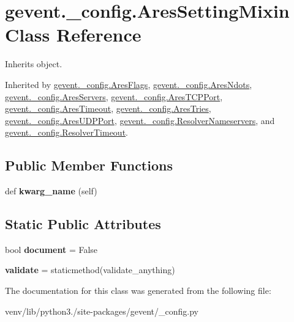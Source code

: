 \hypertarget{classgevent_1_1__config_1_1_ares_setting_mixin}{}\section{gevent.\+\_\+config.\+Ares\+Setting\+Mixin Class Reference}
\label{classgevent_1_1__config_1_1_ares_setting_mixin}


Inherits object.



Inherited by \hyperlink{classgevent_1_1__config_1_1_ares_flags}{gevent.\+\_\+config.\+Ares\+Flags}, \hyperlink{classgevent_1_1__config_1_1_ares_ndots}{gevent.\+\_\+config.\+Ares\+Ndots}, \hyperlink{classgevent_1_1__config_1_1_ares_servers}{gevent.\+\_\+config.\+Ares\+Servers}, \hyperlink{classgevent_1_1__config_1_1_ares_t_c_p_port}{gevent.\+\_\+config.\+Ares\+T\+C\+P\+Port}, \hyperlink{classgevent_1_1__config_1_1_ares_timeout}{gevent.\+\_\+config.\+Ares\+Timeout}, \hyperlink{classgevent_1_1__config_1_1_ares_tries}{gevent.\+\_\+config.\+Ares\+Tries}, \hyperlink{classgevent_1_1__config_1_1_ares_u_d_p_port}{gevent.\+\_\+config.\+Ares\+U\+D\+P\+Port}, \hyperlink{classgevent_1_1__config_1_1_resolver_nameservers}{gevent.\+\_\+config.\+Resolver\+Nameservers}, and \hyperlink{classgevent_1_1__config_1_1_resolver_timeout}{gevent.\+\_\+config.\+Resolver\+Timeout}.

\subsection*{Public Member Functions}
\begin{DoxyCompactItemize}
\item 
\mbox{\label{classgevent_1_1__config_1_1_ares_setting_mixin_ad3edccb92ed533726ac24e6e3cb8096a}} 
def {\bfseries kwarg\+\_\+name} (self)
\end{DoxyCompactItemize}
\subsection*{Static Public Attributes}
\begin{DoxyCompactItemize}
\item 
\mbox{\label{classgevent_1_1__config_1_1_ares_setting_mixin_aa56b38a621bd54de7d269c4014c3286d}} 
bool {\bfseries document} = False
\item 
\mbox{\label{classgevent_1_1__config_1_1_ares_setting_mixin_a76da21c7e0cf02bd0f6846a05c02597b}} 
{\bfseries validate} = staticmethod(validate\+\_\+anything)
\end{DoxyCompactItemize}


The documentation for this class was generated from the following file\+:\begin{DoxyCompactItemize}
\item 
venv/lib/python3./site-\/packages/gevent/\+\_\+config.\+py\end{DoxyCompactItemize}
